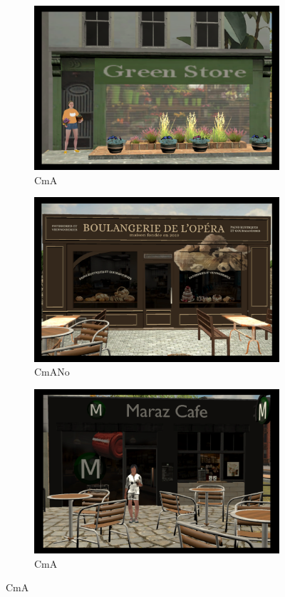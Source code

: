 \begin{figure}[h!]
	\centering
	\begin{subfigure}[b]{0.32\linewidth}
		\includegraphics[width=\linewidth]{figures/45_S(green store)_A.PNG}
		\caption{CmA}
	\end{subfigure}
	\begin{subfigure}[b]{0.32\linewidth}
		\includegraphics[width=\linewidth]{figures/02_S(boulangerie)_noA.PNG}
		\caption{CmANo}
	\end{subfigure}
	\begin{subfigure}[b]{0.32\linewidth}
		\includegraphics[width=\linewidth]{figures/05_S(Maraz cafe)_A.PNG}
		\caption{CmA}
	\end{subfigure}
	

\end{figure}
